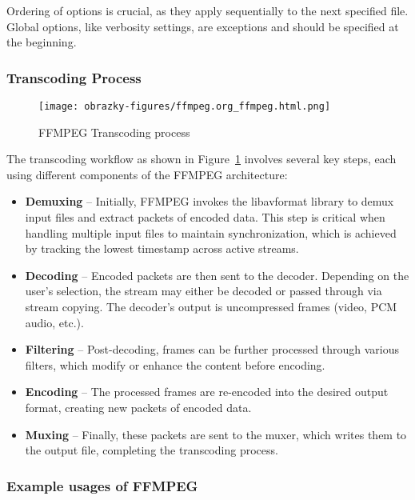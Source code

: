 Ordering of options is crucial, as they apply sequentially to the next specified file. Global options, like verbosity settings, are exceptions and should be specified at the beginning.

\subsubsection{Transcoding Process}
\label{subsec:ffmpeg-transcoding}

\begin{figure}[h]
    \centering
    \texttt{[image: obrazky-figures/ffmpeg.org\_ffmpeg.html.png]}
    \caption{FFMPEG Transcoding process}
    \label{fig:theory:ffmpeg:transcoding}
\end{figure}

The transcoding workflow as shown in Figure~\ref{fig:theory:ffmpeg:transcoding} involves several key steps, each using different components of the FFMPEG architecture:

\begin{itemize}
    \item \textbf{Demuxing} -- Initially, FFMPEG invokes the libavformat library to demux input files and extract packets of encoded data. This step is critical when handling multiple input files to maintain synchronization, which is achieved by tracking the lowest timestamp across active streams.
    \item \textbf{Decoding} -- Encoded packets are then sent to the decoder. Depending on the user's selection, the stream may either be decoded or passed through via stream copying. The decoder's output is uncompressed frames (video, PCM audio, etc.).
    \item \textbf{Filtering} -- Post-decoding, frames can be further processed through various filters, which modify or enhance the content before encoding.
    \item \textbf{Encoding} -- The processed frames are re-encoded into the desired output format, creating new packets of encoded data.
    \item \textbf{Muxing} -- Finally, these packets are sent to the muxer, which writes them to the output file, completing the transcoding process.
\end{itemize}

\subsubsection{Example usages of FFMPEG}
\label{subsubsec:ffmpeg-example-usage}

